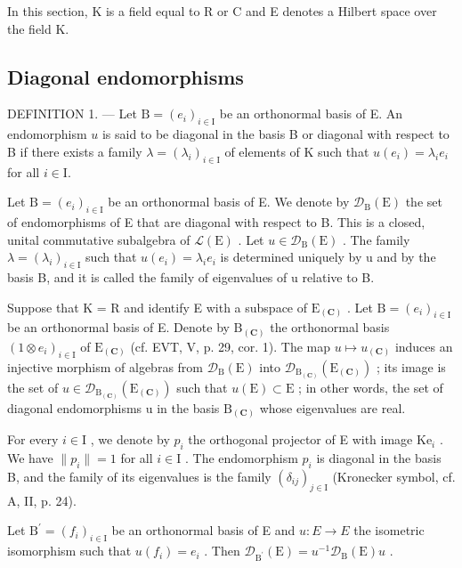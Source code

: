 In this section, K is a field equal to R or C and E denotes a Hilbert space over the field K.

\subsection{Diagonal endomorphisms}

DEFINITION 1. --- Let \(\mathrm{B} = (e_i)_{i \in \mathrm{I}}\) be an orthonormal basis of E. An endomorphism \(u\) is said to be diagonal in the basis B or diagonal with respect to B if there exists a family \(\lambda = (\lambda_i)_{i \in \mathrm{I}}\) of elements of K such that \(u(e_i) = \lambda_i e_i\) for all \(i \in \mathrm{I}\).

Let \(\mathrm{B} = (e_i)_{i \in \mathrm{I}}\) be an orthonormal basis of E. We denote by \(\mathcal{D}_{\mathrm{B}}(\mathrm{E})\) the set of endomorphisms of E that are diagonal with respect to B. This is a closed, unital commutative subalgebra of \(\mathcal{L}(\mathrm{E})\) . Let \(u \in \mathcal{D}_{\mathrm{B}}(\mathrm{E})\) . The family \(\lambda = (\lambda_i)_{i \in \mathrm{I}}\) such that \(u(e_i) = \lambda_i e_i\) is determined uniquely by u and by the basis B, and it is called the family of eigenvalues of u relative to B.

Suppose that K = R and identify E with a subspace of \(\mathrm{E}_{(\mathbf{C})}\) . Let \(\mathrm{B} = (e_i)_{i \in \mathrm{I}}\) be an orthonormal basis of E. Denote by \(\mathrm{B}_{(\mathbf{C})}\) the orthonormal basis \((1 \otimes e_i)_{i \in \mathrm{I}}\) of \(\mathrm{E}_{(\mathbf{C})}\) (cf. EVT, V, p. 29, cor. 1). The map \(u \mapsto u_{(\mathbf{C})}\) induces an injective morphism of algebras from \(\mathcal{D}_{\mathrm{B}}(\mathrm{E})\) into \(\mathcal{D}_{\mathrm{B}_{(\mathbf{C})}}(\mathrm{E}_{(\mathbf{C})})\) ; its image is the set of \(u \in \mathcal{D}_{\mathrm{B}_{(\mathbf{C})}}(\mathrm{E}_{(\mathbf{C})})\) such that \(u(\mathrm{E}) \subset \mathrm{E}\) ; in other words, the set of diagonal endomorphisms u in the basis \(\mathrm{B}_{(\mathbf{C})}\) whose eigenvalues are real.

For every \(i \in \mathrm{I}\) , we denote by \(p_i\) the orthogonal projector of E with image \(\mathrm{Ke}_i\) . We have \(\| p_i \| = 1\) for all \(i \in \mathrm{I}\) . The endomorphism \(p_i\) is diagonal in the basis B, and the family of its eigenvalues is the family \((\delta_{ij})_{j\in\mathrm{I}}\) (Kronecker symbol, cf. A, II, p. 24).

Let \(\mathrm{B}^{\prime}=(f_{i})_{i\in\mathrm{I}}\) be an orthonormal basis of E and \(u:E\to E\) the isometric isomorphism such that \(u(f_{i})=e_{i}\) . Then \(\mathcal{D}_{\mathrm{B}^{\prime}}(\mathrm{E})=u^{-1}\mathcal{D}_{\mathrm{B}}(\mathrm{E})u\) .

